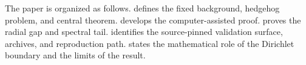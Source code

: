The paper is organized as follows.   defines the fixed
background, hedgehog problem, and central theorem.  
develops the computer-assisted proof.   proves the
radial gap and spectral tail.   identifies the
source-pinned validation surface, archives, and reproduction path.
 states the
mathematical role of the Dirichlet boundary and the limits of the result.
